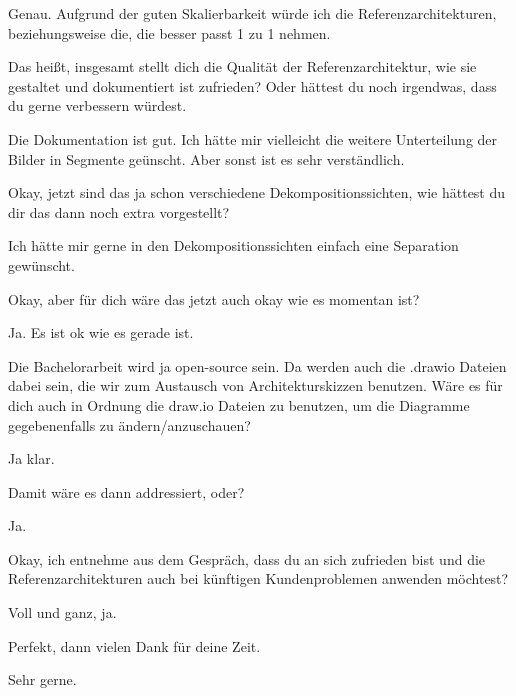 \TVL Genau. Aufgrund der guten Skalierbarkeit würde ich die Referenzarchitekturen, beziehungsweise die, die besser passt 1 zu 1 nehmen.

\LF Das heißt, insgesamt stellt dich die Qualität der Referenzarchitektur, wie sie gestaltet und dokumentiert ist zufrieden? Oder hättest du noch irgendwas, dass du gerne verbessern würdest.

\TVL Die Dokumentation ist gut. Ich hätte mir vielleicht die weitere Unterteilung der Bilder in Segmente geünscht. Aber sonst ist es sehr verständlich.

\LF Okay, jetzt sind das ja schon verschiedene Dekompositionssichten, wie hättest du dir das dann noch extra vorgestellt?

\TVL Ich hätte mir gerne in den Dekompositionssichten einfach eine Separation gewünscht.

\LF Okay, aber für dich wäre das jetzt auch okay wie es momentan ist?

\TVL Ja. Es ist ok wie es gerade ist.

\LF Die Bachelorarbeit wird ja open-source sein. Da werden auch die .drawio Dateien dabei sein, die wir zum Austausch von Architekturskizzen benutzen. Wäre es für dich auch in Ordnung die draw.io Dateien zu benutzen, um die Diagramme gegebenenfalls zu ändern/anzuschauen?

\TVL Ja klar.

\LF Damit wäre es dann addressiert, oder?

\TVL Ja.

\LF Okay, ich entnehme aus dem Gespräch, dass du an sich zufrieden bist und die Referenzarchitekturen auch bei künftigen Kundenproblemen anwenden möchtest?

\TVL Voll und ganz, ja.

\LF Perfekt, dann vielen Dank für deine Zeit.

\TVL Sehr gerne.